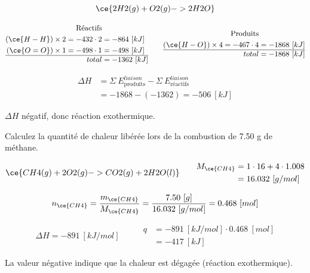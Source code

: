 \documentclass[
  11pt,
  french,
  a4paper,
  openany]{book}
\begin{document}
\begin{Answer}
\[
\ce{2 H2(g) + O2(g) -> 2 H2O}
\]

\[
\begin{split}
  \text{Réactifs}& \\
  (\ce{H-H}) \times 2 = -432 \cdot 2 &= -864\ [kJ] \\
  (\ce{O=O}) \times 1 = -498 \cdot 1 &= -498\ [kJ] \\
  \hline
  total &= -1362\ [kJ]
\end{split}
\qquad
\begin{split}
  \text{Produits}& \\
  (\ce{H-O}) \times 4 = -467 \cdot 4 &= -1868\ [kJ] \\
  \hline
  total &= -1868\ [kJ]
\end{split}
\]

\[
\begin{split}
\Delta H &= \Sigma\ E^{liaison}_{\text{produits}} - \Sigma\ E^{liaison}_{\text{réactifs}} \\
  &= -1868-(-1362) = -506\ [kJ]
\end{split}
\]

\(\Delta H\) négatif, donc réaction exothermique.

\end{Answer}

\begin{Exercise}

Calculez la quantité de chaleur libérée lors de la combustion de 7.50 g de méthane.



\end{Exercise}

\begin{Answer}
\[
\begin{split}
\ce{CH4(g) + 2 O2(g) -> CO2(g) + 2 H2O(l)}
\end{split}
\qquad
\begin{split}
M_{\ce{CH4}} &= 1 \cdot 16 + 4 \cdot 1.008 \\
&= 16.032\ [g/mol]
\end{split}
\]

\[
n_{\ce{CH4}} = \frac{m_{\ce{CH4}}}{M_{\ce{CH4}}} = \frac{7.50\ [g]}{16.032\ [g/mol]} = 0.468\ [mol]
\]

\[
\begin{split}
\Delta H = -891\ [kJ/mol]
\end{split}
\qquad
\begin{split}
q &= -891\ [kJ/mol] \cdot 0.468\ [mol] \\
&= -417\ [kJ]
\end{split}
\]

La valeur négative indique que la chaleur est dégagée (réaction exothermique).

\end{Answer}
\end{document}

